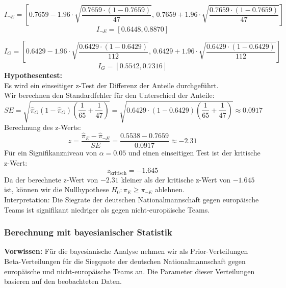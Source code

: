 \documentclass[a4paper,12pt]{article}
\begin{document}
\[
I_{\neg E} = \left[ 0.7659 - 1.96 \cdot \sqrt{\frac{0.7659 \cdot (1-0.7659)}{47}}, \, 0.7659 + 1.96 \cdot \sqrt{\frac{0.7659 \cdot (1-0.7659)}{47}} \right]
\]
\[
I_{\neg E} = [0.6448, 0.8870]
\]

\[
I_G = \left[ 0.6429 - 1.96 \cdot \sqrt{\frac{0.6429 \cdot (1-0.6429)}{112}}, \, 0.6429 + 1.96 \cdot \sqrt{\frac{0.6429 \cdot (1-0.6429)}{112}} \right]
\]
\[
I_G = [0.5542, 0.7316]
\]
\textbf{Hypothesentest:} \\
Es wird ein einseitiger z-Test der Differenz der Anteile durchgeführt. \\

Wir berechnen den Standardfehler für den Unterschied der Anteile:
\[
SE = \sqrt{\hat{\pi}_G(1 - \hat{\pi}_G) \left(\frac{1}{65} + \frac{1}{47}\right)} = \sqrt{0.6429 \cdot (1 - 0.6429) \left(\frac{1}{65} + \frac{1}{47}\right)} \approx 0.0917
\]
Berechnung des z-Werts:
\[
z = \frac{\hat{\pi}_E - \hat{\pi}_{\neg E}}{SE} = \frac{0.5538 - 0.7659}{0.0917} \approx -2.31
\]
Für ein Signifikanzniveau von \( \alpha = 0.05 \) und einen einseitigen Test ist der kritische z-Wert:
\[
z_{\text{kritisch}} = -1.645
\]
Da der berechnete z-Wert von \(-2.31\) kleiner als der kritische z-Wert von \(-1.645\) ist, können wir die Nullhypothese \( H_0 : \pi_E \geq \pi_{\neg E} \) ablehnen.\\
Interpretation: Die Siegrate der deutschen Nationalmannschaft gegen europäische Teams ist signifikant niedriger als gegen nicht-europäische Teams.

\subsubsection{Berechnung mit bayesianischer Statistik}

\textbf{Vorwissen:}
Für die bayesianische Analyse nehmen wir als Prior-Verteilungen Beta-Verteilungen für die Siegquote der deutschen Nationalmannschaft gegen europäische und nicht-europäische Teams an. Die Parameter dieser Verteilungen basieren auf den beobachteten Daten.
\end{document}
